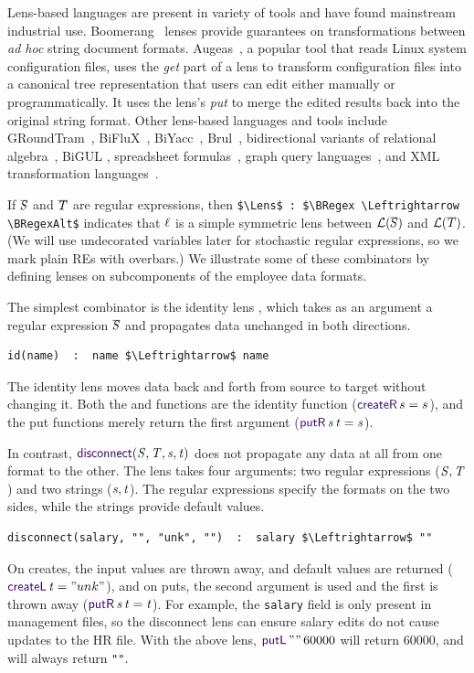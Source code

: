 \documentclass[12pt]{article}
\begin{document}
{Lens-based languages are present in variety of tools and have found mainstream
industrial use.
Boomerang~\cite{boomerang, Matching10} lenses provide
guarantees on transformations between {\em ad hoc} string document formats.
Augeas~\cite{augeas}, a popular tool that reads Linux system configuration
files, uses the \emph{get} part of a lens to transform configuration
files into a canonical tree representation that users can edit
either manually or 
programmatically.  It uses the lens's \emph{put} to merge the edited
results back into the original string format.  Other lens-based languages and
tools include 
%
GRoundTram~\cite{Hidaka2011GRoundTramAI},
%
BiFluX~\cite{DBLP:conf/ppdp/PachecoZH14}, 
%
BiYacc~\cite{DBLP:conf/staf/ZhuK0SH15},
%
Brul~\cite{DBLP:conf/etaps/ZanLKH16},
%
bidirectional variants of 
relational algebra~\cite{BohannonPierceVaughan},
%
BiGUL \cite{DBLP:conf/pepm/KoZH16}, 
%
spreadsheet formulas~\cite{DBLP:conf/vl/MacedoPSC14},
graph query languages~\cite{DBLP:conf/icfp/HidakaHIKMN10},
and
XML transformation languages~\cite{DBLP:conf/pepm/LiuHT07}.


If $\BRegex$ and $\BRegexAlt$ are regular expressions, then
\lstinline{$\Lens$ : $\BRegex \Leftrightarrow \BRegexAlt$} indicates that
$\mathit{\ell}$ is a simple symmetric lens between $\LanguageOf{\BRegex}$ and
$\LanguageOf{\BRegexAlt}$. (We will use undecorated variables later for
stochastic regular expressions, so we mark plain REs with overbars.)
We illustrate some of these
combinators by defining lenses on subcomponents of the employee data formats.

The simplest combinator is the identity lens \IdentityLens, which takes as an
argument a regular expression $\BRegex$ and propagates data unchanged
in both directions.
%
\begin{lstlisting}
id(name)  :  name $\Leftrightarrow$ name
\end{lstlisting}
%
The identity lens moves data back and forth from source to target without
changing it. Both the \CreateR and \CreateL functions are the identity function
($\CreateR \App s = s$), and the put functions merely return the first argument
($\PutROf{\String}{\StringAlt} = \String$).

In contrast, $\DisconnectOf{\Regex}{\RegexAlt}{\String}{\StringAlt}$ does not propagate any data at all
from one format to the other.  The \Disconnect lens takes four arguments: two
regular expressions ($\mathit{S}, \mathit{T}$) and two strings ($\mathit{s}, \mathit{t}$). The regular expressions specify the formats
on the two sides, while the strings provide default values. 
%
\begin{lstlisting}
disconnect(salary, "", "unk", "")  :  salary $\Leftrightarrow$ ""
\end{lstlisting}
%
On creates, the input values are thrown away, and default values are
returned ($\CreateLOf{\StringAlt} =
\lstinline{"unk"}$), and on puts, the second argument is used and the first is
thrown away ($\PutROf{\String}{\StringAlt} = \StringAlt$). For 
example, the \lstinline{salary} field is only present in management files,
so the disconnect lens can ensure salary edits do not cause updates to the
HR file.
With the above lens, $\PutL \App \lstinline{""} \App 60000$ will return 60000,
and \PutR will always return \lstinline{""}.

}
\end{document}
